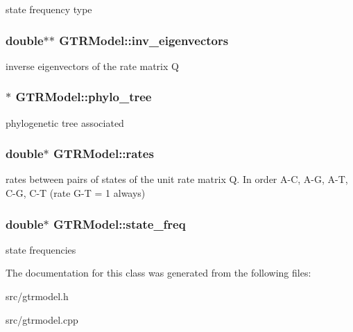 \label{classGTRModel_a699318690979ff66c655dd3022d5127a}
state frequency type \hypertarget{classGTRModel_a74c9c92fe909714d09f75fdcb8459ac9}{
\subsubsection[{inv\_\-eigenvectors}]{\setlength{\rightskip}{0pt plus 5cm}double$\ast$$\ast$ {\bf GTRModel::inv\_\-eigenvectors}}}
\label{classGTRModel_a74c9c92fe909714d09f75fdcb8459ac9}
inverse eigenvectors of the rate matrix Q \hypertarget{classGTRModel_a21785f014f182f075d608cfc9118e6fb}{
\subsubsection[{phylo\_\-tree}]{$\ast$ {\bf GTRModel::phylo\_\-tree}}}
\label{classGTRModel_a21785f014f182f075d608cfc9118e6fb}
phylogenetic tree associated \hypertarget{classGTRModel_ad194dff1b132c09e4c2ebff0f8cdedab}{
\subsubsection[{rates}]{\setlength{\rightskip}{0pt plus 5cm}double$\ast$ {\bf GTRModel::rates}}}
\label{classGTRModel_ad194dff1b132c09e4c2ebff0f8cdedab}
rates between pairs of states of the unit rate matrix Q. In order A-\/C, A-\/G, A-\/T, C-\/G, C-\/T (rate G-\/T = 1 always) \hypertarget{classGTRModel_a03c2ca5094d8c6563dbded5a05b26319}{
\subsubsection[{state\_\-freq}]{\setlength{\rightskip}{0pt plus 5cm}double$\ast$ {\bf GTRModel::state\_\-freq}}}
\label{classGTRModel_a03c2ca5094d8c6563dbded5a05b26319}
state frequencies 

The documentation for this class was generated from the following files:\begin{DoxyCompactItemize}
\item 
src/gtrmodel.h\item 
src/gtrmodel.cpp\end{DoxyCompactItemize}
